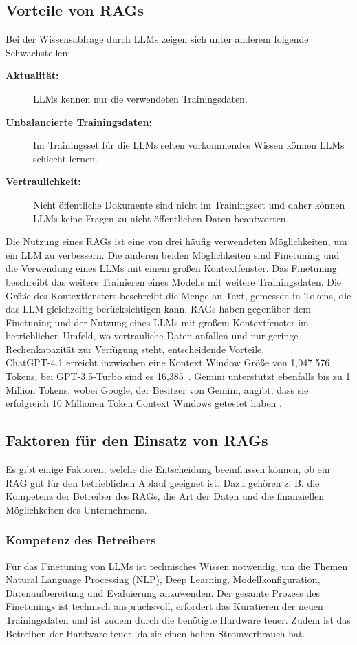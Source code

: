 \subsection{Vorteile von RAGs}
Bei der Wissensabfrage durch LLMs zeigen sich unter anderem folgende Schwachstellen:
\begin{description}
    \item [\textbf{Aktualität:}] LLMs kennen nur die verwendeten Trainingsdaten.
    \item [\textbf{Unbalancierte Trainingsdaten:}] Im Trainingsset für die LLMs selten vorkommendes Wissen können LLMs schlecht lernen. \cite{gao2023rtre,2022arXiv221108411K}
    \item [\textbf{Vertraulichkeit:}]Nicht öffentliche Dokumente sind nicht im Trainingsset und daher können LLMs keine Fragen zu nicht öffentlichen Daten beantworten.
\end{description}

Die Nutzung eines RAGs ist eine von drei häufig verwendeten Möglichkeiten, um ein LLM zu verbessern.
Die anderen beiden Möglichkeiten sind Finetuning und die Verwendung eines LLMs mit einem großen Kontextfenster.
Das Finetuning beschreibt das weitere Trainieren eines Modells mit weitere Trainingsdaten.
Die Größe des Kontextfensters beschreibt die Menge an Text, gemessen in Tokens, die das LLM gleichzeitig berücksichtigen kann.
RAGs haben gegenüber dem Finetuning und der Nutzung eines LLMs mit großem Kontextfenster im betrieblichen Umfeld, wo vertrauliche Daten anfallen und nur geringe Rechenkapazität zur Verfügung steht, entscheidende Vorteile.\\
ChatGPT-4.1 erreicht inzwischen eine Kontext Window Größe von 1,047,576 Tokens, bei GPT-3.5-Turbo sind es 16,385~\cite{openai_gpt_4_vision}.
Gemini unterstützt ebenfalls bis zu 1 Million Tokens, wobei Google, der Besitzer von Gemini, angibt, dass sie erfolgreich 10 Millionen Token Context Windows getestet haben \cite{google_gemini_next_generation_model}.

\subsection{Faktoren für den Einsatz von RAGs}
Es gibt einige Faktoren, welche die Entscheidung beeinflussen können, ob ein RAG gut für den betrieblichen Ablauf geeignet ist.
Dazu gehören z. B. die Kompetenz der Betreiber des RAGs, die Art der Daten und die finanziellen Möglichkeiten des Unternehmens.


\subsubsection{Kompetenz des Betreibers}
Für das Finetuning von LLMs ist technisches Wissen notwendig, um die Themen Natural Language Processing (NLP), Deep Learning, Modellkonfiguration, Datenaufbereitung und Evaluierung anzuwenden.
Der gesamte Prozess des Finetunings ist technisch anspruchsvoll, erfordert das Kuratieren der neuen Trainingsdaten und ist zudem durch die benötigte Hardware teuer.
Zudem ist das Betreiben der Hardware teuer, da sie einen hohen Stromverbrauch hat.

